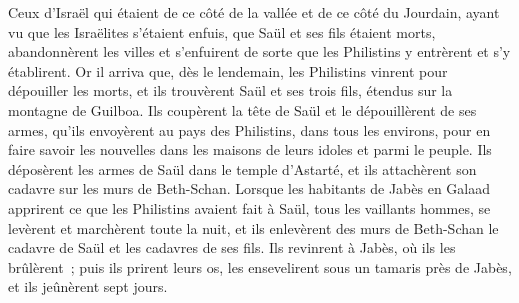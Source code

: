 \begin{multicols}{2}
Ceux d'Israël qui étaient de ce côté de la vallée et de ce côté du Jourdain, ayant vu que les Israëlites s'étaient enfuis, que Saül et ses fils étaient morts, abandonnèrent les villes et s'enfuirent de sorte que les Philistins y entrèrent et s'y établirent.
Or il arriva que, dès le lendemain, les Philistins vinrent pour dépouiller les morts, et ils trouvèrent Saül et ses trois fils, étendus sur la montagne de Guilboa.
Ils coupèrent la tête de Saül et le dépouillèrent de ses armes, qu'ils envoyèrent au pays des Philistins, dans tous les environs, pour en faire savoir les nouvelles dans les maisons de leurs idoles et parmi le peuple.
Ils déposèrent les armes de Saül dans le temple d'Astarté, et ils attachèrent son cadavre sur les murs de Beth-Schan.
Lorsque les habitants de Jabès en Galaad apprirent ce que les Philistins avaient fait à Saül,
tous les vaillants hommes, se levèrent et marchèrent toute la nuit, et ils enlevèrent des murs de Beth-Schan le cadavre de Saül et les cadavres de ses fils. Ils revinrent à Jabès, où ils les brûlèrent~;
puis ils prirent leurs os, les ensevelirent sous un tamaris près de Jabès, et ils jeûnèrent sept jours.
\PPE{}
\end{multicols}
